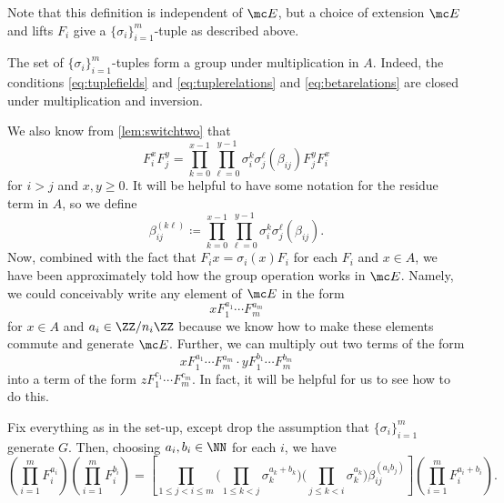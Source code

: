 \documentclass{article}
\numberwithin{equation}{section}
\begin{document}
Note that this definition is independent of $\mc E$, but a choice of extension $\mc E$ and lifts $F_i$ give a $\{\sigma_i\}_{i=1}^m$-tuple as described above.
\begin{remark}
	The set of $\{\sigma_i\}_{i=1}^m$-tuples form a group under multiplication in $A$. Indeed, the conditions \autoref{eq:tuplefields} and \autoref{eq:tuplerelations} and \autoref{eq:betarelations} are closed under multiplication and inversion.
\end{remark}
We also know from \autoref{lem:switchtwo} that
\[F_i^xF_j^y=\prod_{k=0}^{x-1}\prod_{\ell=0}^{y-1}\sigma_i^k\sigma_j^\ell(\beta_{ij})F_j^yF_i^x\]
for $i>j$ and $x,y\ge0$. It will be helpful to have some notation for the residue term in $A$, so we define
\[\beta_{ij}^{(k\ell)}\coloneqq\prod_{k=0}^{x-1}\prod_{\ell=0}^{y-1}\sigma_i^k\sigma_j^\ell(\beta_{ij}).\]
Now, combined with the fact that $F_ix=\sigma_i(x)F_i$ for each $F_i$ and $x\in A$, we have been approximately told how the group operation works in $\mc E$. Namely, we could conceivably write any element of $\mc E$ in the form
\[xF_1^{a_1}\cdots F_m^{a_m}\]
for $x\in A$ and $a_i\in\ZZ/n_i\ZZ$ because we know how to make these elements commute and generate $\mc E$. Further, we can multiply out two terms of the form
\[xF_1^{a_1}\cdots F_m^{a_m}\cdot yF_1^{b_1}\cdots F_m^{b_m}\]
into a term of the form $zF_1^{c_1}\cdots F_m^{c_m}$. In fact, it will be helpful for us to see how to do this.
\begin{proposition} \label{prop:multiplytwoelements}
	Fix everything as in the set-up, except drop the assumption that $\{\sigma_i\}_{i=1}^m$ generate $ G$. Then, choosing $a_i,b_i\in\NN$ for each $i$, we have
	\[\left(\prod_{i=1}^mF_i^{a_i}\right)\left(\prod_{i=1}^mF_i^{b_i}\right)=\left[\prod_{1\le j<i\le m}\Bigg(\prod_{1\le k<j}\sigma_k^{a_k+b_k}\Bigg)\Bigg(\prod_{j\le k<i}\sigma_k^{a_k}\Bigg)\beta_{ij}^{(a_ib_j)}\right]\left(\prod_{i=1}^mF_i^{a_i+b_i}\right).\]
\end{proposition}
\end{document}
